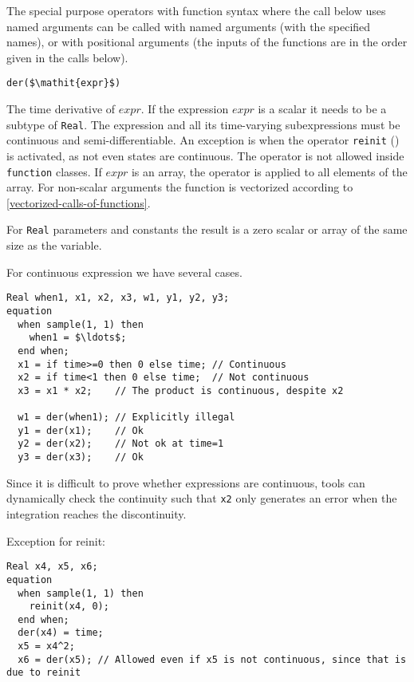 The special purpose operators with function syntax where the call below uses named arguments can be called with named arguments (with the specified names), or with positional arguments (the inputs of the functions are in the order given in the calls below).

\begin{operatordefinition}[der]
\begin{synopsis}\begin{lstlisting}
der($\mathit{expr}$)
\end{lstlisting}\end{synopsis}
\begin{semantics}
The time derivative of $\mathit{expr}$.
If the expression $\mathit{expr}$ is a scalar it needs to be a subtype of \lstinline!Real!.
The expression and all its time-varying subexpressions must be continuous and semi-differentiable.
An exception is when the operator \lstinline!reinit! () is activated, as not even states are continuous.
The operator is not allowed inside \lstinline!function! classes.
If $\mathit{expr}$ is an array, the operator is applied to all elements of the array.
For non-scalar arguments the function is vectorized according to \cref{vectorized-calls-of-functions}.
\begin{nonnormative}
For \lstinline!Real! parameters and constants the result is a zero scalar or array of the same size as the variable.
\end{nonnormative}

\begin{example}
For continuous expression we have several cases.
\begin{lstlisting}[language=modelica]
  Real when1, x1, x2, x3, w1, y1, y2, y3;
equation
  when sample(1, 1) then
    when1 = $\ldots$;
  end when;
  x1 = if time>=0 then 0 else time; // Continuous
  x2 = if time<1 then 0 else time;  // Not continuous
  x3 = x1 * x2;    // The product is continuous, despite x2

  w1 = der(when1); // Explicitly illegal
  y1 = der(x1);    // Ok
  y2 = der(x2);    // Not ok at time=1
  y3 = der(x3);    // Ok
\end{lstlisting}
Since it is difficult to prove whether expressions are continuous, tools can dynamically check the continuity such that \lstinline!x2! only generates an error when the integration reaches the discontinuity.
\end{example}

\begin{example}
Exception for reinit:
\begin{lstlisting}[language=modelica]
  Real x4, x5, x6;
equation
  when sample(1, 1) then
    reinit(x4, 0);
  end when;
  der(x4) = time;
  x5 = x4^2;
  x6 = der(x5); // Allowed even if x5 is not continuous, since that is due to reinit
\end{lstlisting}
\end{example}

\end{semantics}
\end{operatordefinition}

